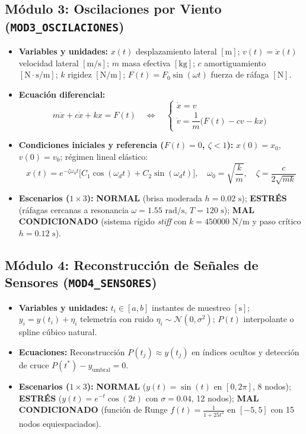 \documentclass[11pt,a4paper]{article}
\begin{document}
\subsection{Módulo 3: Oscilaciones por Viento (\texttt{MOD3\_OSCILACIONES})}
\begin{itemize}
    \item \textbf{Variables y unidades:} $x(t)$ desplazamiento lateral $[\text{m}]$; $v(t)=\dot{x}(t)$ velocidad lateral $[\text{m/s}]$; $m$ masa efectiva $[\text{kg}]$; $c$ amortiguamiento $[\text{N}\cdot\text{s/m}]$; $k$ rigidez $[\text{N/m}]$; $F(t)=F_0\sin(\omega t)$ fuerza de ráfaga $[\text{N}]$.
    \item \textbf{Ecuación diferencial:}
    \[
        m\ddot{x} + c\dot{x} + kx = F(t) \quad \Longleftrightarrow \quad
        \begin{cases}
            \dot{x} = v \\
            \dot{v} = \dfrac{1}{m}\big(F(t) - cv - kx\big)
        \end{cases}
    \]
    \item \textbf{Condiciones iniciales y referencia ($F(t)=0$, $\zeta<1$):} $x(0)=x_0$, $v(0)=v_0$; régimen lineal elástico:
    \[
        x(t) = e^{-\zeta\omega_0 t}\big[C_1\cos(\omega_d t) + C_2\sin(\omega_d t)\big], \quad \omega_0 = \sqrt{\frac{k}{m}}, \quad \zeta = \frac{c}{2\sqrt{mk}}
    \]
    \item \textbf{Escenarios ($1\times 3$):} \textbf{NORMAL} (brisa moderada $h=0.02\text{ s}$); \textbf{ESTRÉS} (ráfagas cercanas a resonancia $\omega=1.55\text{ rad/s}$, $T=120\text{ s}$); \textbf{MAL CONDICIONADO} (sistema rígido \textit{stiff} con $k=450000\text{ N/m}$ y paso crítico $h=0.12\text{ s}$).
\end{itemize}

\subsection{Módulo 4: Reconstrucción de Señales de Sensores (\texttt{MOD4\_SENSORES})}
\begin{itemize}
    \item \textbf{Variables y unidades:} $t_i \in [a,b]$ instantes de muestreo $[\text{s}]$; $y_i = y(t_i)+\eta_i$ telemetría con ruido $\eta_i \sim \mathcal{N}(0,\sigma^2)$; $P(t)$ interpolante o spline cúbico natural.
    \item \textbf{Ecuaciones:} Reconstrucción $P(t_j)\approx y(t_j)$ en índices ocultos y detección de cruce $P(t^*)-y_{\text{umbral}}=0$.
    \item \textbf{Escenarios ($1\times 3$):} \textbf{NORMAL} ($y(t)=\sin(t)$ en $[0,2\pi]$, 8 nodos); \textbf{ESTRÉS} ($y(t)=e^{-t}\cos(2t)$ con $\sigma=0.04$, 12 nodos); \textbf{MAL CONDICIONADO} (función de Runge $f(t)=\frac{1}{1+25t^2}$ en $[-5,5]$ con 15 nodos equiespaciados).
\end{itemize}
\end{document}
